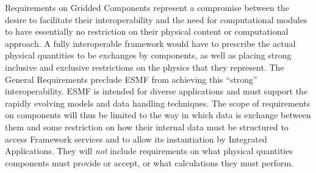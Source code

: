 Requirements on Gridded Components represent a compromise between
the desire to facilitate their interoperability and the need for
computational modules to have essentially no restriction on their
physical content or computational approach.
A fully interoperable framework would
have to prescribe the actual physical quantities to be exchanges
by components, as well as placing strong inclusive and exclusive 
restrictions on the physics that they represent. The General Requirements
 preclude ESMF from achieving this  ``strong'' interoperability.
ESMF is intended for  diverse
applications and must support  the rapidly  evolving 
models and data handling techniques.
The scope of requirements on components will thus be limited to the
way in which data is exchange between them and some restriction
on how their internal data must be structured to access Framework
services and to allow its instantiation by Integrated Applications.
They will {\em not} include requirements on what physical quantities
components must provide or accept, or what calculations they
must perform.

















